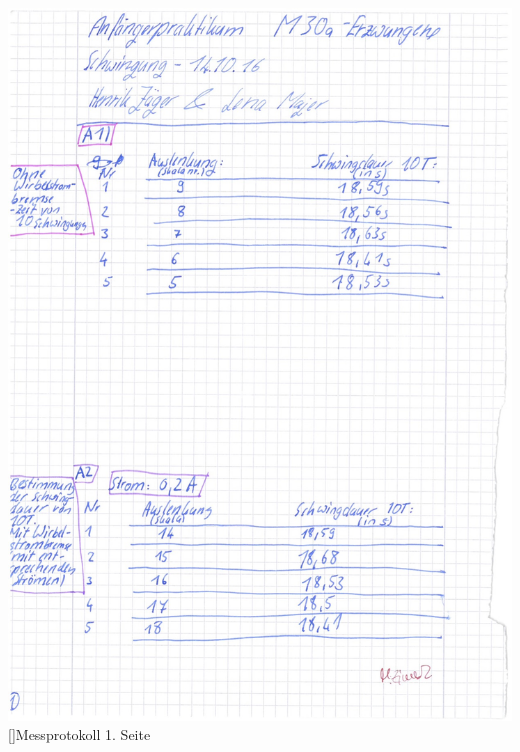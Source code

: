 \documentclass[12pt,a4paper,]{scrreprt}
\begin{document}
	\begin{center}
		\includegraphics[scale=0.33]{1.jpg}
    	[]{Messprotokoll 1. Seite}
    	\pagebreak

\end{center}
\end{document}
